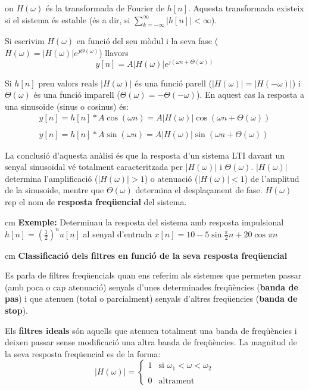 \documentclass{article}
\begin{document}
\noindent
on $H(\omega)$ és la transformada de Fourier de $h[n]$. Aquesta transformada existeix si el sistema és estable 
(és a dir, si $\sum_{k=-\infty}^\infty |h[n]| < \infty$).

Si escrivim $H(\omega)$ en funció del seu mòdul i la seva fase ($H(\omega)=|H(\omega)| e^{j \Theta(\omega)}$) llavors
\begin{equation}
y[n]=A |H(\omega)| e^{j (\omega n + \Theta(\omega))}
\end{equation}

Si $h[n]$ pren valors reals $|H(\omega)|$ és una funció parell ($|H(\omega)|=|H(-\omega)|$) i 
$\Theta(\omega)$ és una funció imparell ($\Theta(\omega)=-\Theta(-\omega)$).
En aquest cas la resposta a una sinusoide (sinus o cosinus) és:
\begin{equation}
\begin{array}{l}
y[n]=h[n] * A \cos(\omega n)=A |H(\omega)| \cos(\omega n + \Theta(\omega)) \\ \\
y[n]=h[n] * A \sin(\omega n)=A |H(\omega)| \sin(\omega n + \Theta(\omega)) 
\end{array}
\end{equation}

La conclusió d'aquesta anàlisi és que la resposta d'un sistema LTI davant un senyal sinusoïdal
vé totalment caracteritzada per $|H(\omega)|$ i $\Theta(\omega)$. 
$|H(\omega)|$ determina l'amplificació ($|H(\omega)| > 1$) o atenuació ($|H(\omega)| < 1$)
de l'amplitud de la sinusoide, mentre que $\Theta(\omega)$ determina el desplaçament de fase.
$H(\omega)$ rep el nom de \textbf{resposta freqüencial} del sistema.

 cm
\noindent
\textbf{Exemple:} Determinau la resposta del sistema amb resposta impulsional $h[n]=(\frac{1}{2})^n u[n]$
al senyal d'entrada $x[n]=10 - 5 \sin \frac{\pi}{2} n + 20 \cos \pi n$


 cm
\textbf{Classificació dels filtres en funció de la seva resposta freqüencial}

Es parla de filtres freqüencials quan ens referim als sistemes
que permeten passar (amb poca o cap atenuació) senyals d'unes determinades freqüències
(\textbf{banda de pas})
i que atenuen (total o parcialment) senyals d'altres freqüencies (\textbf{banda de stop}).

Els \textbf{filtres ideals} són aquells que atenuen totalment una banda de freqüències
i deixen passar sense modificació una altra banda de freqüències. La magnitud 
de la seva resposta freqüencial es de la forma:
\[
|H(\omega)|=\begin{cases} 1 & \text{si } \omega_1 < \omega < \omega_2 \\ \\
0 & \text{altrament} \end{cases}
\]
\end{document}
